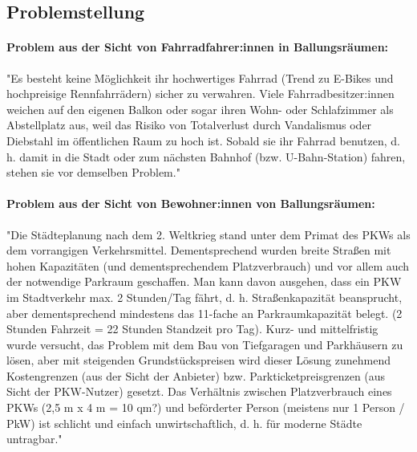 \subsection{Problemstellung}

\paragraph{Problem aus der Sicht von Fahrradfahrer:innen in Ballungsräumen:}
"Es besteht keine Möglichkeit ihr hochwertiges Fahrrad (Trend zu E-Bikes und hochpreisige Rennfahrrädern) sicher zu verwahren. Viele Fahrradbesitzer:innen weichen auf den eigenen Balkon oder sogar ihren Wohn- oder Schlafzimmer als Abstellplatz aus, weil das Risiko von Totalverlust durch Vandalismus oder Diebstahl im öffentlichen Raum zu hoch ist. Sobald sie ihr Fahrrad benutzen, d. h. damit in die Stadt oder zum nächsten Bahnhof (bzw. U-Bahn-Station) fahren, stehen sie vor demselben Problem." 

\paragraph{Problem aus der Sicht von Bewohner:innen von Ballungsräumen:}
"Die Städteplanung nach dem 2. Weltkrieg stand unter dem Primat des PKWs als dem vorrangigen Verkehrsmittel. Dementsprechend wurden breite Straßen mit hohen Kapazitäten (und dementsprechendem Platzverbrauch) und vor allem auch der notwendige Parkraum geschaffen. Man kann davon ausgehen, dass ein PKW im Stadtverkehr max. 2 Stunden/Tag fährt, d. h. Straßenkapazität beansprucht, aber dementsprechend mindestens das 11-fache an Parkraumkapazität belegt. (2 Stunden Fahrzeit = 22 Stunden Standzeit pro Tag). Kurz- und mittelfristig wurde versucht, das Problem mit dem Bau von Tiefgaragen und Parkhäusern zu lösen, aber mit steigenden Grundstückspreisen wird dieser Lösung zunehmend Kostengrenzen (aus der Sicht der Anbieter) bzw. Parkticketpreisgrenzen (aus Sicht der PKW-Nutzer) gesetzt. Das Verhältnis zwischen Platzverbrauch eines PKWs (2,5 m x 4 m = 10 qm?) und beförderter Person (meistens nur 1 Person / PkW) ist schlicht und einfach unwirtschaftlich, d. h. für moderne Städte untragbar." 
